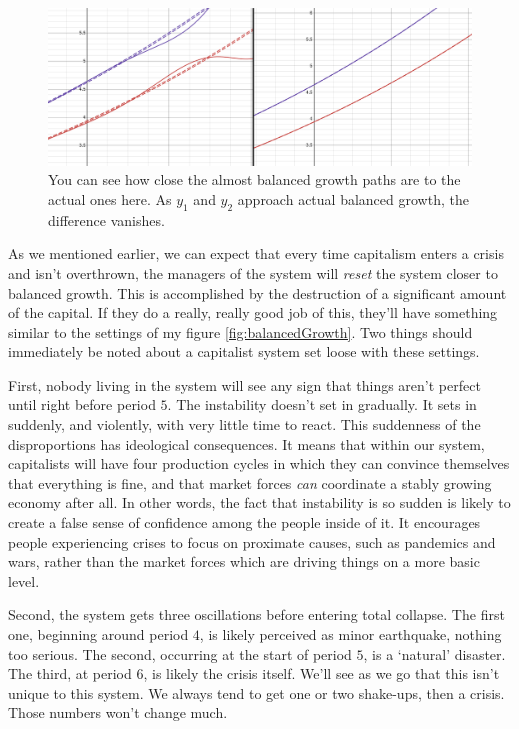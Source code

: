 \documentclass{article}
\theoremstyle{theorem}
\begin{document}
\begin{figure}[H]
\centering
\includegraphics[scale=.5]{Images/verySimilar}
\caption{You can see how close the almost balanced growth paths are to the actual ones here. As $y_1$ and $y_2$ approach actual balanced growth, the difference vanishes.}
\end{figure}
As we mentioned earlier, we can expect that every time capitalism enters a crisis and isn't overthrown, the managers of the system will \emph{reset} the system closer to balanced growth. This is accomplished by the destruction of a significant amount of the capital. If they do a really, really good job of this, they'll have something similar to the settings of my figure \ref{fig:balancedGrowth}. Two things should immediately be noted about a capitalist system set loose with these settings.\par 
First, nobody living in the system will see any sign that things aren't perfect until right before period $5$. The instability doesn't set in gradually. It sets in suddenly, and violently, with very little time to react. This suddenness of the disproportions has ideological consequences. It means that within our system, capitalists will have four production cycles in which they can convince themselves that everything is fine, and that market forces \emph{can} coordinate a stably growing economy after all. In other words, the fact that instability is so sudden is likely to create a false sense of confidence among the people inside of it. It encourages people experiencing crises to focus on proximate causes, such as pandemics and wars, rather than the market forces which are driving things on a more basic level.  \par
Second, the system gets three oscillations before entering total collapse. The first one, beginning around period $4$, is likely perceived as minor earthquake, nothing too serious. The second, occurring at the start of period $5$, is a `natural' disaster. The third, at period $6$, is likely the crisis itself. We'll see as we go that this isn't unique to this system. We always tend to get one or two shake-ups, then a crisis. Those numbers won't change much. \par 
\end{document}
